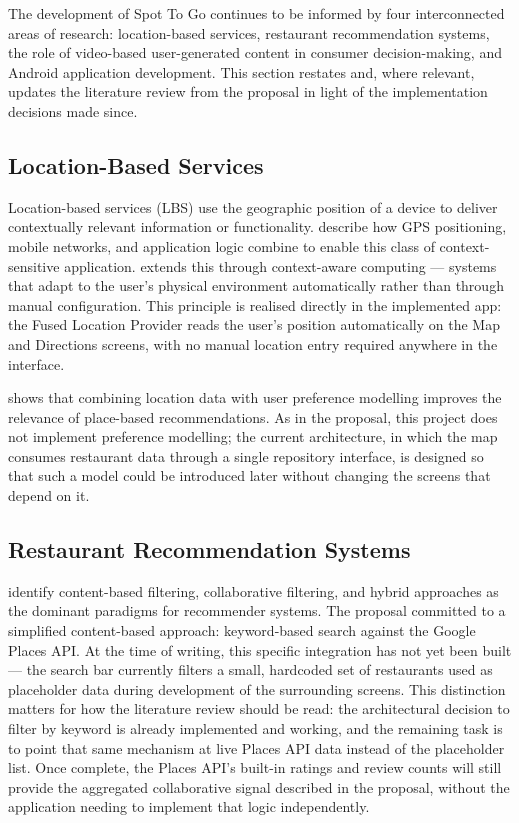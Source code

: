 \documentclass[12pt, a4paper]{article}
\begin{document}
The development of Spot To Go continues to be informed by four interconnected areas of research: location-based services, restaurant recommendation systems, the role of video-based user-generated content in consumer decision-making, and Android application development. This section restates and, where relevant, updates the literature review from the proposal in light of the implementation decisions made since.

\subsection{Location-Based Services}

Location-based services (LBS) use the geographic position of a device to deliver contextually relevant information or functionality. \citet{schiller2004} describe how GPS positioning, mobile networks, and application logic combine to enable this class of context-sensitive application. \citet{dey2001} extends this through context-aware computing — systems that adapt to the user's physical environment automatically rather than through manual configuration. This principle is realised directly in the implemented app: the Fused Location Provider reads the user's position automatically on the Map and Directions screens, with no manual location entry required anywhere in the interface.

\citet{bao2012} shows that combining location data with user preference modelling improves the relevance of place-based recommendations. As in the proposal, this project does not implement preference modelling; the current architecture, in which the map consumes restaurant data through a single repository interface, is designed so that such a model could be introduced later without changing the screens that depend on it.

\subsection{Restaurant Recommendation Systems}

\citet{adomavicius2005} identify content-based filtering, collaborative filtering, and hybrid approaches as the dominant paradigms for recommender systems. The proposal committed to a simplified content-based approach: keyword-based search against the Google Places API. At the time of writing, this specific integration has not yet been built — the search bar currently filters a small, hardcoded set of restaurants used as placeholder data during development of the surrounding screens. This distinction matters for how the literature review should be read: the architectural decision to filter by keyword is already implemented and working, and the remaining task is to point that same mechanism at live Places API data instead of the placeholder list. Once complete, the Places API's built-in ratings and review counts will still provide the aggregated collaborative signal described in the proposal, without the application needing to implement that logic independently.
\end{document}
